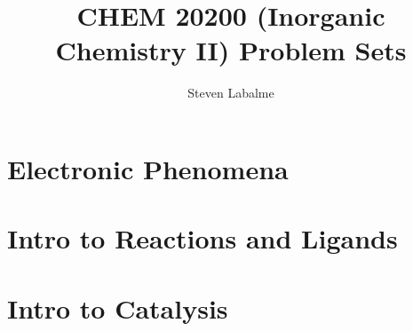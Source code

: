 \documentclass[titlepage]{article}
\title{CHEM 20200 (Inorganic Chemistry II) Problem Sets}
\author{Steven Labalme}
\begin{document}
\maketitle



\tableofcontents
\newpage



\pagestyle{main}
\renewcommand{\leftmark}{Homework \thesection}
\section{Electronic Phenomena}

\newpage



\section{Intro to Reactions and Ligands}

\newpage



\section{Intro to Catalysis}

\newpage



\renewcommand{\leftmark}{References}
\printbibliography[heading=bibintoc]
\end{document}
